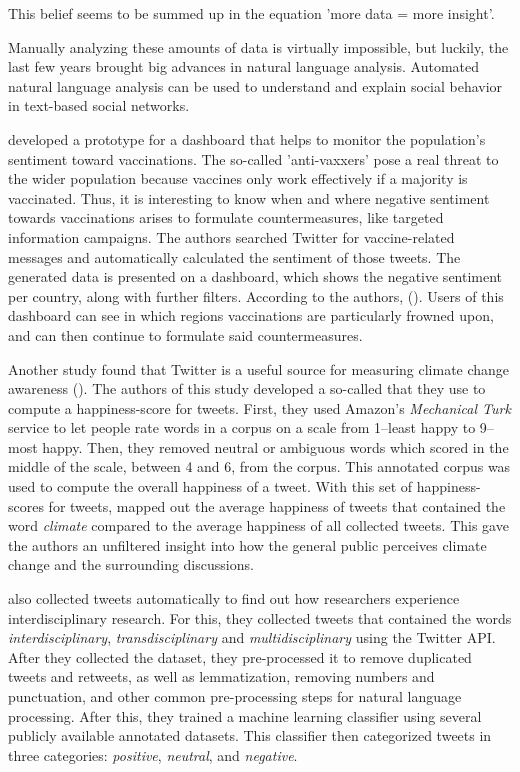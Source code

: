This belief seems to be summed up in the equation 'more data = more insight'.

Manually analyzing these amounts of data is virtually impossible, but luckily, the last few years brought big advances in natural language analysis. Automated natural language analysis can be used to understand and explain social behavior in text-based social networks.

\citeauthor{bahk2016publicly} developed a prototype for a dashboard that helps to monitor the population's sentiment toward vaccinations. The so-called 'anti-vaxxers' pose a real threat to the wider population because vaccines only work effectively if a majority is vaccinated. Thus, it is interesting to know when and where negative sentiment towards vaccinations arises to formulate countermeasures, like targeted information campaigns. The authors searched Twitter for vaccine-related messages and automatically calculated the sentiment of those tweets. The generated data is presented on a dashboard, which shows the negative sentiment per country, along with further filters. According to the authors,  (\cite[343]{bahk2016publicly}). Users of this dashboard can see in which regions vaccinations are particularly frowned upon, and can then continue to formulate said countermeasures.

Another study found that Twitter is a useful source for measuring climate change awareness (\cite{codyClimateChangeSentiment2015}). The authors of this study developed a so-called  that they use to compute a happiness-score for tweets. First, they used Amazon's \emph{Mechanical Turk} service to let people rate words in a corpus on a scale from 1--least happy to 9--most happy. Then, they removed neutral or ambiguous words which scored in the middle of the scale, between 4 and 6, from the corpus. This annotated corpus was used to compute the overall happiness of a tweet. With this set of happiness-scores for tweets, \citeauthor{codyClimateChangeSentiment2015} mapped out the average happiness of tweets that contained the word \emph{climate} compared to the average happiness of all collected tweets. This gave the authors an unfiltered insight into how the general public perceives climate change and the surrounding discussions.

\citeauthor{weberInterdisciplinaryOptimismSentiment2019} also collected tweets automatically to find out how researchers experience interdisciplinary research. For this, they collected tweets that contained the words \emph{interdisciplinary}, \emph{transdisciplinary} and \emph{multidisciplinary} using the Twitter API. After they collected the dataset, they pre-processed it to remove duplicated tweets and retweets, as well as lemmatization, removing numbers and punctuation, and other common pre-processing steps for natural language processing. After this, they trained a machine learning classifier using several publicly available annotated datasets. This classifier then categorized tweets in three categories: \emph{positive}, \emph{neutral}, and \emph{negative}.

